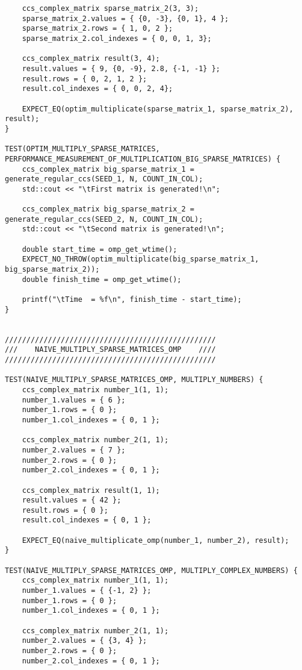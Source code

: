 \documentclass{report}
\begin{document}
\begin{lstlisting}
    ccs_complex_matrix sparse_matrix_2(3, 3);
    sparse_matrix_2.values = { {0, -3}, {0, 1}, 4 };
    sparse_matrix_2.rows = { 1, 0, 2 };
    sparse_matrix_2.col_indexes = { 0, 0, 1, 3};
    
    ccs_complex_matrix result(3, 4);
    result.values = { 9, {0, -9}, 2.8, {-1, -1} };
    result.rows = { 0, 2, 1, 2 };
    result.col_indexes = { 0, 0, 2, 4};
    
    EXPECT_EQ(optim_multiplicate(sparse_matrix_1, sparse_matrix_2), result);
}

TEST(OPTIM_MULTIPLY_SPARSE_MATRICES, PERFORMANCE_MEASUREMENT_OF_MULTIPLICATION_BIG_SPARSE_MATRICES) {
    ccs_complex_matrix big_sparse_matrix_1 = generate_regular_ccs(SEED_1, N, COUNT_IN_COL);
    std::cout << "\tFirst matrix is generated!\n";

    ccs_complex_matrix big_sparse_matrix_2 = generate_regular_ccs(SEED_2, N, COUNT_IN_COL);
    std::cout << "\tSecond matrix is generated!\n";

    double start_time = omp_get_wtime();
    EXPECT_NO_THROW(optim_multiplicate(big_sparse_matrix_1, big_sparse_matrix_2));
    double finish_time = omp_get_wtime();

    printf("\tTime  = %f\n", finish_time - start_time);
}


/////////////////////////////////////////////////
///    NAIVE_MULTIPLY_SPARSE_MATRICES_OMP    ////
/////////////////////////////////////////////////

TEST(NAIVE_MULTIPLY_SPARSE_MATRICES_OMP, MULTIPLY_NUMBERS) {
    ccs_complex_matrix number_1(1, 1);
    number_1.values = { 6 };
    number_1.rows = { 0 };
    number_1.col_indexes = { 0, 1 };

    ccs_complex_matrix number_2(1, 1);
    number_2.values = { 7 };
    number_2.rows = { 0 };
    number_2.col_indexes = { 0, 1 };

    ccs_complex_matrix result(1, 1);
    result.values = { 42 };
    result.rows = { 0 };
    result.col_indexes = { 0, 1 };

    EXPECT_EQ(naive_multiplicate_omp(number_1, number_2), result);
}

TEST(NAIVE_MULTIPLY_SPARSE_MATRICES_OMP, MULTIPLY_COMPLEX_NUMBERS) {
    ccs_complex_matrix number_1(1, 1);
    number_1.values = { {-1, 2} };
    number_1.rows = { 0 };
    number_1.col_indexes = { 0, 1 };

    ccs_complex_matrix number_2(1, 1);
    number_2.values = { {3, 4} };
    number_2.rows = { 0 };
    number_2.col_indexes = { 0, 1 };


\end{lstlisting}
\end{document}

